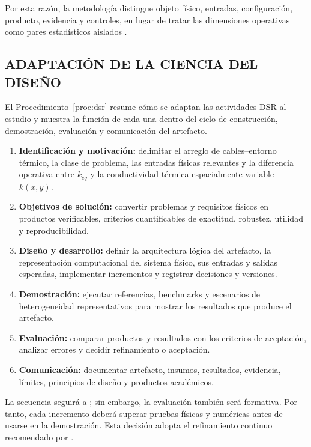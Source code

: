 \documentclass[11pt,a4paper,oneside]{report}
\newcommand{\kx}{k(x,y)}
\begin{document}
Por esta razón, la metodología distingue objeto físico, entradas, configuración, producto, evidencia y controles, en lugar de tratar las dimensiones operativas como pares estadísticos aislados \parencites[55--56]{peffers2007}[342--344]{gregor2013}.

\subsection{ADAPTACIÓN DE LA CIENCIA DEL DISEÑO}

El Procedimiento~\ref{proc:dsr} resume cómo se adaptan las actividades DSR al estudio y muestra la función de cada una dentro del ciclo de construcción, demostración, evaluación y comunicación del artefacto.

\begin{procedure}[htbp]
\caption{Proceso DSR adaptado al estudio.}
\label{proc:dsr}
\begin{enumerate}[label=\textbf{A\arabic*.}]
  \item \textbf{Identificación y motivación:} delimitar el arreglo de cables--entorno térmico, la clase de problema, las entradas físicas relevantes y la diferencia operativa entre $k_{eq}$ y la conductividad térmica espacialmente variable $\kx$.
  \item \textbf{Objetivos de solución:} convertir problemas y requisitos físicos en productos verificables, criterios cuantificables de exactitud, robustez, utilidad y reproducibilidad.
  \item \textbf{Diseño y desarrollo:} definir la arquitectura lógica del artefacto, la representación computacional del sistema físico, sus entradas y salidas esperadas, implementar incrementos y registrar decisiones y versiones.
  \item \textbf{Demostración:} ejecutar referencias, benchmarks y escenarios de heterogeneidad representativos para mostrar los resultados que produce el artefacto.
  \item \textbf{Evaluación:} comparar productos y resultados con los criterios de aceptación, analizar errores y decidir refinamiento o aceptación.
  \item \textbf{Comunicación:} documentar artefacto, insumos, resultados, evidencia, límites, principios de diseño y productos académicos.
\end{enumerate}
\end{procedure}

La secuencia seguirá a \textcite[55--56]{peffers2007}; sin embargo, la evaluación también será formativa. Por tanto, cada incremento deberá superar pruebas físicas y numéricas antes de usarse en la demostración. Esta decisión adopta el refinamiento continuo recomendado por \textcite[198--203]{delport2024}.
\end{document}
